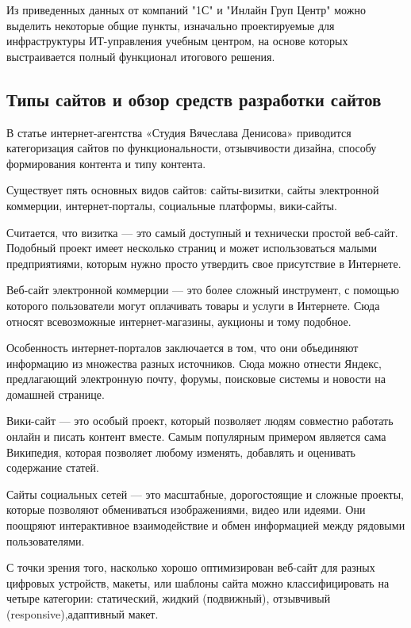 Из приведенных данных от компаний "1С" и "Инлайн Груп Центр" можно выделить некоторые общие пункты, изначально проектируемые для инфраструктуры ИТ-управления учебным центром, на основе которых выстраивается полный функционал итогового решения.

\subsection{Типы сайтов и обзор средств разработки сайтов}

В статье \cite{denisov} интернет-агентства «Студия Вячеслава Денисова» приводится категоризация сайтов по функциональности, отзывчивости дизайна, способу формирования контента и типу контента.


Существует пять основных видов сайтов: сайты-визитки, сайты электронной коммерции, интернет-порталы, социальные платформы, вики-сайты.

Считается, что визитка — это самый доступный и технически простой веб-сайт. Подобный проект имеет несколько страниц и может использоваться малыми предприятиями, которым нужно просто утвердить свое присутствие в Интернете.

Веб-сайт электронной коммерции — это более сложный инструмент, с помощью которого пользователи могут оплачивать товары и услуги в Интернете.
Сюда относят всевозможные интернет-магазины, аукционы и тому подобное.

Особенность интернет-порталов заключается в том, что они объединяют информацию из множества разных источников.
Сюда можно отнести Яндекс, предлагающий электронную почту, форумы, поисковые системы и новости на домашней странице.

Вики-сайт — это особый проект, который позволяет людям совместно работать онлайн и писать контент вместе.
Самым популярным примером является сама Википедия, которая позволяет любому изменять, добавлять и оценивать содержание статей.

Сайты социальных сетей — это масштабные, дорогостоящие и сложные проекты, которые позволяют обмениваться изображениями, видео или идеями.
Они поощряют интерактивное взаимодействие и обмен информацией между рядовыми пользователями.


С точки зрения того, насколько хорошо оптимизирован веб-сайт для разных цифровых устройств, макеты, или шаблоны сайта можно классифицировать на четыре категории: статический, жидкий (подвижный), отзывчивый (responsive),адаптивный макет.

